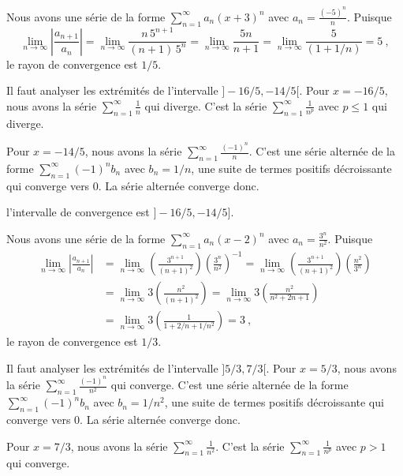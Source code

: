 { Nous avons une série de la forme
$\displaystyle \sum_{n=1}^\infty a_n (x+3)^n$ avec
$\displaystyle a_n = \frac{(-5)^n}{n}$.  Puisque
\[
\lim_{n\rightarrow \infty} \left| \frac{a_{n+1}}{a_n}\right| = 
\lim_{n\rightarrow \infty}
\frac{ n\,5^{n+1}}{(n+1)\,5^n}
= \lim_{n\rightarrow \infty} \frac{5n}{n+1}
= \lim_{n\rightarrow \infty} \frac{5}{(1+1/n)}
= 5  \ ,
\]
le rayon de convergence est $1/5$.

Il faut analyser les extrémités de l'intervalle
$]-16/5, -14/5[$.  Pour $x=-16/5$, nous avons la série
$\displaystyle \sum_{n=1}^\infty \frac{1}{n}$ qui diverge.  C'est la
série $\displaystyle \sum_{n=1}^\infty \frac{1}{n^p}$ avec
$p \leq 1$ qui diverge.

Pour $x=-14/5$, nous avons la série
$\displaystyle \sum_{n=1}^\infty \frac{(-1)^n}{n}$.  C'est une série
alternée de la forme $\displaystyle \sum_{n=1}^\infty (-1)^n b_n$
avec $\displaystyle b_n = 1/n$, une suite de termes
positifs décroissante qui converge vers $0$.  La
série alternée converge donc.

l'intervalle de convergence est $]-16/5, -14/5]$.

 Nous avons une série de la forme
$\displaystyle \sum_{n=1}^\infty a_n (x-2)^n$ avec
$\displaystyle a_n = \frac{3^n}{n^2}$.  Puisque
\begin{align*}
\lim_{n\to \infty} \left|\frac{a_{n+1}}{a_n}\right|
&= \lim_{n\to \infty} \left( \frac{3^{n+1}}{(n+1)^2}\right)
\left( \frac{3^n}{n^2}\right)^{-1}
= \lim_{n\to \infty} \left( \frac{3^{n+1}}{(n+1)^2}\right)
\left( \frac{n^2}{3^n}\right) \\
&= \lim_{n\to \infty} 3\left( \frac{n^2}{(n+1)^2}\right)
= \lim_{n\to \infty} 3\left( \frac{n^2}{n^2+2n +1}\right) \\
&= \lim_{n\to \infty} 3\left( \frac{1}{1+2/n +1/n^2}\right)
= 3 \ ,
\end{align*}
le rayon de convergence est $1/3$.

Il faut analyser les extrémités de l'intervalle
$]5/3, 7/3[$.  Pour $x=5/3$, nous avons la série
$\displaystyle \sum_{n=1}^\infty \frac{(-1)^n}{n^2}$ qui converge.
C'est une série alternée de la forme
$\displaystyle \sum_{n=1}^\infty (-1)^n b_n$
avec $\displaystyle b_n = 1/n^2$, une suite de termes
positifs décroissante qui converge vers $0$.  La
série alternée converge donc.

Pour $x=7/3$, nous avons la série
$\displaystyle \sum_{n=1}^\infty \frac{1}{n^2}$.  C'est la
série $\displaystyle \sum_{n=1}^\infty \frac{1}{n^p}$ avec
$p > 1$ qui converge.

}
